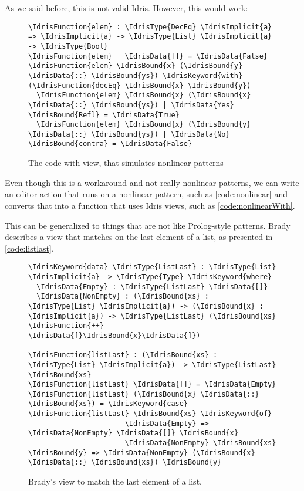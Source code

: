 As we said before, this is not valid Idris. However, this would work:

\begin{figure}[ht]
\caption{The code with view, that simulates nonlinear patterns}
\label{code:nonlinearWith}
\begin{Verbatim}
\IdrisFunction{elem} : \IdrisType{DecEq} \IdrisImplicit{a} => \IdrisImplicit{a} -> \IdrisType{List} \IdrisImplicit{a} -> \IdrisType{Bool}
\IdrisFunction{elem} _ \IdrisData{[]} = \IdrisData{False}
\IdrisFunction{elem} \IdrisBound{x} (\IdrisBound{y} \IdrisData{::} \IdrisBound{ys}) \IdrisKeyword{with} (\IdrisFunction{decEq} \IdrisBound{x} \IdrisBound{y})
  \IdrisFunction{elem} \IdrisBound{x} (\IdrisBound{x} \IdrisData{::} \IdrisBound{ys}) | \IdrisData{Yes} \IdrisBound{Refl} = \IdrisData{True}
  \IdrisFunction{elem} \IdrisBound{x} (\IdrisBound{y} \IdrisData{::} \IdrisBound{ys}) | \IdrisData{No} \IdrisBound{contra} = \IdrisData{False}
\end{Verbatim}
\end{figure}

Even though this is a workaround and not really nonlinear patterns, we can
write an \Elab editor action that runs on a nonlinear pattern, such as
\autoref{code:nonlinear} and converts that into a function that uses Idris
views, such as \autoref{code:nonlinearWith}.

This can be generalized to things that are not like Prolog-style patterns.
Brady describes a view that matches on the last element of
a list, as presented in \autoref{code:listlast}.

\begin{figure}[ht]
\caption{Brady's view to match the last element of a list.\cite{tdd}}
\label{code:listlast}
\begin{Verbatim}
\IdrisKeyword{data} \IdrisType{ListLast} : \IdrisType{List} \IdrisImplicit{a} -> \IdrisType{Type} \IdrisKeyword{where}
  \IdrisData{Empty} : \IdrisType{ListLast} \IdrisData{[]}
  \IdrisData{NonEmpty} : (\IdrisBound{xs} : \IdrisType{List} \IdrisImplicit{a}) -> (\IdrisBound{x} : \IdrisImplicit{a}) -> \IdrisType{ListLast} (\IdrisBound{xs} \IdrisFunction{++} \IdrisData{[}\IdrisBound{x}\IdrisData{]})

\IdrisFunction{listLast} : (\IdrisBound{xs} : \IdrisType{List} \IdrisImplicit{a}) -> \IdrisType{ListLast} \IdrisBound{xs}
\IdrisFunction{listLast} \IdrisData{[]} = \IdrisData{Empty}
\IdrisFunction{listLast} (\IdrisBound{x} \IdrisData{::} \IdrisBound{xs}) = \IdrisKeyword{case} \IdrisFunction{listLast} \IdrisBound{xs} \IdrisKeyword{of}
                       \IdrisData{Empty} => \IdrisData{NonEmpty} \IdrisData{[]} \IdrisBound{x}
                       \IdrisData{NonEmpty} \IdrisBound{xs} \IdrisBound{y} => \IdrisData{NonEmpty} (\IdrisBound{x} \IdrisData{::} \IdrisBound{xs}) \IdrisBound{y}
\end{Verbatim}
\end{figure}


